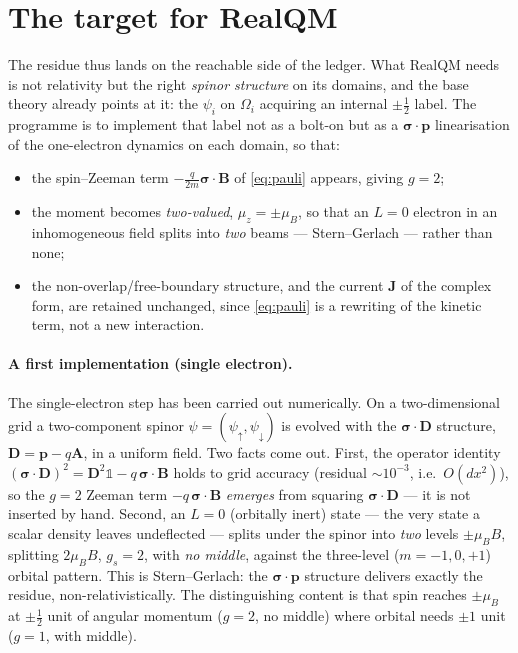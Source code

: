 \documentclass[11pt]{article}
\begin{document}
\section{The target for RealQM}
\label{sec:target}

The residue thus lands on the reachable side of the ledger. What RealQM needs is not relativity but the
right \emph{spinor structure} on its domains, and the base theory already points at it: the $\psi_i$ on
$\Omega_i$ acquiring an internal $\pm\tfrac12$ label. The programme is to implement that label not as a
bolt-on but as a $\boldsymbol\sigma\cdot\mathbf p$ linearisation of the one-electron dynamics on each
domain, so that:
\begin{itemize}
\item the spin--Zeeman term $-\tfrac{q}{2m}\boldsymbol\sigma\cdot\mathbf B$ of \eqref{eq:pauli} appears,
giving $g=2$;
\item the moment becomes \emph{two-valued}, $\mu_z=\pm\mu_B$, so that an $L=0$ electron in an
inhomogeneous field splits into \emph{two} beams --- Stern--Gerlach --- rather than none;
\item the non-overlap/free-boundary structure, and the current $\mathbf J$ of the complex form, are
retained unchanged, since \eqref{eq:pauli} is a rewriting of the kinetic term, not a new interaction.
\end{itemize}

\paragraph{A first implementation (single electron).} The single-electron step has been carried out
numerically. On a two-dimensional grid a two-component spinor $\psi=(\psi_\uparrow,\psi_\downarrow)$ is
evolved with the $\boldsymbol\sigma\cdot\mathbf D$ structure, $\mathbf D = \mathbf p-q\mathbf A$, in a
uniform field. Two facts come out. First, the operator identity
$(\boldsymbol\sigma\cdot\mathbf D)^2 = \mathbf D^2\mathbb 1 - q\,\boldsymbol\sigma\cdot\mathbf B$ holds to
grid accuracy (residual $\sim 10^{-3}$, i.e.\ $O(dx^2)$), so the $g=2$ Zeeman term $-q\,\boldsymbol\sigma
\cdot\mathbf B$ \emph{emerges} from squaring $\boldsymbol\sigma\cdot\mathbf D$ --- it is not inserted by
hand. Second, an $L=0$ (orbitally inert) state --- the very state a scalar density leaves undeflected ---
splits under the spinor into \emph{two} levels $\pm\mu_B B$, splitting $2\mu_B B$, $g_s=2$, with
\emph{no middle}, against the three-level ($m=-1,0,+1$) orbital pattern. This is Stern--Gerlach: the
$\boldsymbol\sigma\cdot\mathbf p$ structure delivers exactly the residue, non-relativistically. The
distinguishing content is that spin reaches $\pm\mu_B$ at $\pm\tfrac12$ unit of angular momentum ($g=2$,
no middle) where orbital needs $\pm1$ unit ($g=1$, with middle).
\end{document}
